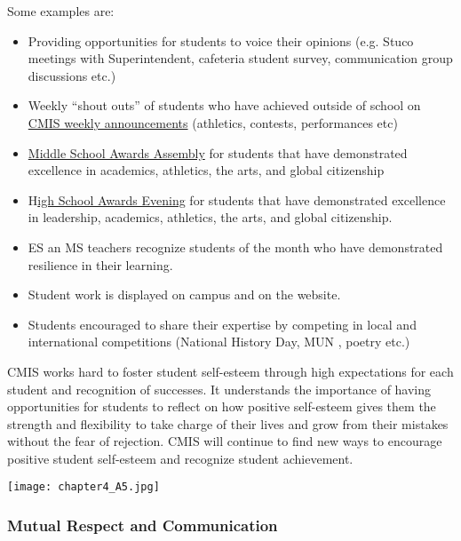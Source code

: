 \begin{findings}
Some examples are:
\begin{itemize}
\item Providing opportunities for students to voice their opinions (e.g. Stuco meetings with Superintendent, cafeteria student survey, communication group discussions etc.)
\item Weekly “shout outs” of students who have achieved outside of school on \href{http://blogs.cmis.ac.th/eagles/friday-september-16-2016/}{CMIS weekly announcements} (athletics, contests, performances etc)
\item\href{https://docs.google.com/a/cmis.ac.th/document/d/1DgY3NXB6m6qvmWnaRr2B2jswCGHRjaPFNPJA2Xzk1qw/edit?usp=sharing}{ Middle School Awards Assembly} for students that have demonstrated excellence in academics, athletics, the arts, and global citizenship
\item H\href{https://docs.google.com/document/d/1pxioSUeOgKZ4dT1jA9DiVzDjZjtrxuM-Gjqh7fRy0Us/edit?usp=sharing}{igh School Awards Evening} for students that have demonstrated excellence in leadership, academics, athletics, the arts, and global  citizenship.
\item ES an MS teachers recognize students of the month who have demonstrated resilience in their learning.
\item Student work is displayed on campus and on the website. 
\item Students encouraged to share their expertise by competing in local and international competitions (National History Day, MUN , poetry  etc.)
\end{itemize}


CMIS works hard to foster student self-esteem through high expectations for each student and recognition of successes. It understands the importance of having opportunities for students to reflect on how positive self-esteem gives them the strength and flexibility to take charge of their lives and grow from their mistakes without the fear of rejection. CMIS will continue to find new ways to encourage positive student self-esteem and recognize student achievement. 
\end{findings}

{\centering\texttt{[image: chapter4\_A5.jpg]}}

\subsubsection{Mutual Respect and Communication}

